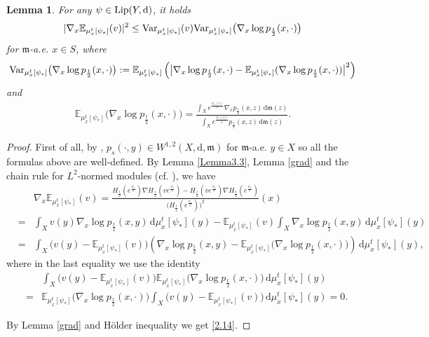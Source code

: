 \documentclass[a4paper,11pt]{article}
\numberwithin{equation}{section}
\theoremstyle{plain}
\newtheorem{lemma}[theorem]{Lemma}
\theoremstyle{definition}
\theoremstyle{remark}
\newcommand{\mm}{\mathfrak m}
\newcommand{\E}{\mathbb{E}}
\newcommand{\Lip}{\mathop{\rm Lip}\nolimits}
\renewcommand{\d}{{\mathrm d}}
\begin{document}
		
\medskip

	\begin{lemma}\label{prop0.5}
		For any $\psi\in \Lip(Y,  \d)$,  it holds
		\begin{equation}\label{2.14}
			|\nabla_x \E_{\mu_x^t[\psi_*]}(v)|^2\leq {\rm{Var}}_{ \mu_x^t[\psi_*]}(v) {\rm{Var}}_{ \mu_x^t[\psi_*]}\big(\nabla_x \log p_\frac{t}{2}(x,\cdot)\big)
		\end{equation}
		for $\mm$-a.e. $x\in S$, where   $${\rm{Var}}_{ \mu_x^t[\psi_*]}\big(\nabla_x \log p_\frac{t}{2}(x,\cdot)\big):=\E_{\mu_x^t[\psi_*]}\left(\big|\nabla_x \log p_\frac{t}{2}(x,\cdot)-	\E_{\mu_x^t[\psi_*]}(\nabla_x \log p_\frac{t}{2}(x,\cdot))\big|^2\right)$$
		and
		\begin{equation*}
			\begin{aligned}
				\E_{\mu_x^t[\psi_*]}\big(\nabla_x \log p_\frac{t}{2}(x,\cdot)\big)
				= \frac{\int_X e^\frac{\psi_*(z)}{t} \nabla_x p_\frac{t}{2}(x,z)\,\d\mm(z)}{\int_X e^\frac{\psi_*(z)}{t} p_\frac{t}{2}(x,z)\,\d\mm(z)}.
			\end{aligned}
		\end{equation*}
	\end{lemma}
	
	\begin{proof}
	First of all,  by \cite{zbMATH06580546},   $p_s(\cdot,y)\in W^{1,2}(X,\d,\mm)$ for $\mm$-a.e. $y\in X$ so all the formulas above are well-defined.  	By Lemma \ref{Lemma3.3}, Lemma \ref{grad} and the  chain rule for  $L^2$-normed  modules (cf. \cite[Theorem 4.3.3]{zbMATH07183685}),  we have
		\begin{eqnarray*}
		&&\nabla_x \E_{\mu_x^t[\psi_*]}(v)=\frac{H_\frac{t}{2}(e^\frac{\psi_*}{t})\nabla H_\frac{t}{2}(v e^\frac{\psi_*}{t})-H_\frac{t}{2}(v e^\frac{\psi_*}{t})\nabla H_\frac{t}{2}(e^\frac{\psi_*}{t})}{\big(H_\frac{t}{2}(e^\frac{\psi_*}{t})\big)^2}(x)\\
		&=& \int_{X} v(y)\nabla_x \log p_\frac{t}{2}(x,y)\,\d\mu_x^t[\psi_*](y)-\E_{\mu_x^t[\psi_*]}(v)\int_{X} \nabla_x \log p_\frac{t}{2}(x,y)\,\d\mu_x^t[\psi_*](y)\\ &=& \int_{X} \big(v(y)-\E_{\mu_x^t[\psi_*]}(v)\big)\left(\nabla_x \log p_\frac{t}{2}(x,y)-	\E_{\mu_x^t[\psi_*]}\big(\nabla_x \log p_\frac{t}{2}(x,\cdot)\big)\right)\,\d\mu_x^t[\psi_*](y),
		\end{eqnarray*}
where in the last equality we use the identity
\begin{eqnarray*}
&&\int_{X} \big(v(y)-\E_{\mu_x^t[\psi_*]}(v)\big)\E_{\mu_x^t[\psi_*]}\big(\nabla_x \log p_\frac{t}{2}(x,\cdot)\big)\,\d\mu_x^t[\psi_*](y)\\ &=&\E_{\mu_x^t[\psi_*]}\big(\nabla_x \log p_\frac{t}{2}(x,\cdot)\big)\int_{X} \big(v(y)-\E_{\mu_x^t[\psi_*]}(v)\big)\,\d\mu_x^t[\psi_*](y)=0.
\end{eqnarray*}	

By Lemma \ref{grad} and  H\"older inequality we get  \eqref{2.14}.
	\end{proof}
	
\end{document}
